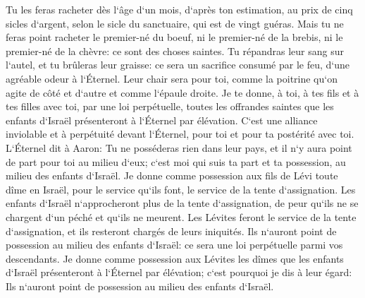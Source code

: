 \verse Tu les feras racheter dès l`âge d`un mois, d`après ton estimation, au prix de cinq sicles d`argent, selon le sicle du sanctuaire, qui est de vingt guéras. 
\verse Mais tu ne feras point racheter le premier-né du boeuf, ni le premier-né de la brebis, ni le premier-né de la chèvre: ce sont des choses saintes. Tu répandras leur sang sur l`autel, et tu brûleras leur graisse: ce sera un sacrifice consumé par le feu, d`une agréable odeur à l`Éternel. 
\verse Leur chair sera pour toi, comme la poitrine qu`on agite de côté et d`autre et comme l`épaule droite. 
\verse Je te donne, à toi, à tes fils et à tes filles avec toi, par une loi perpétuelle, toutes les offrandes saintes que les enfants d`Israël présenteront à l`Éternel par élévation. C`est une alliance inviolable et à perpétuité devant l`Éternel, pour toi et pour ta postérité avec toi. 
\verse L`Éternel dit à Aaron: Tu ne posséderas rien dans leur pays, et il n`y aura point de part pour toi au milieu d`eux; c`est moi qui suis ta part et ta possession, au milieu des enfants d`Israël. 
\verse Je donne comme possession aux fils de Lévi toute dîme en Israël, pour le service qu`ils font, le service de la tente d`assignation. 
\verse Les enfants d`Israël n`approcheront plus de la tente d`assignation, de peur qu`ils ne se chargent d`un péché et qu`ils ne meurent. 
\verse Les Lévites feront le service de la tente d`assignation, et ils resteront chargés de leurs iniquités. Ils n`auront point de possession au milieu des enfants d`Israël: ce sera une loi perpétuelle parmi vos descendants. 
\verse Je donne comme possession aux Lévites les dîmes que les enfants d`Israël présenteront à l`Éternel par élévation; c`est pourquoi je dis à leur égard: Ils n`auront point de possession au milieu des enfants d`Israël. 
